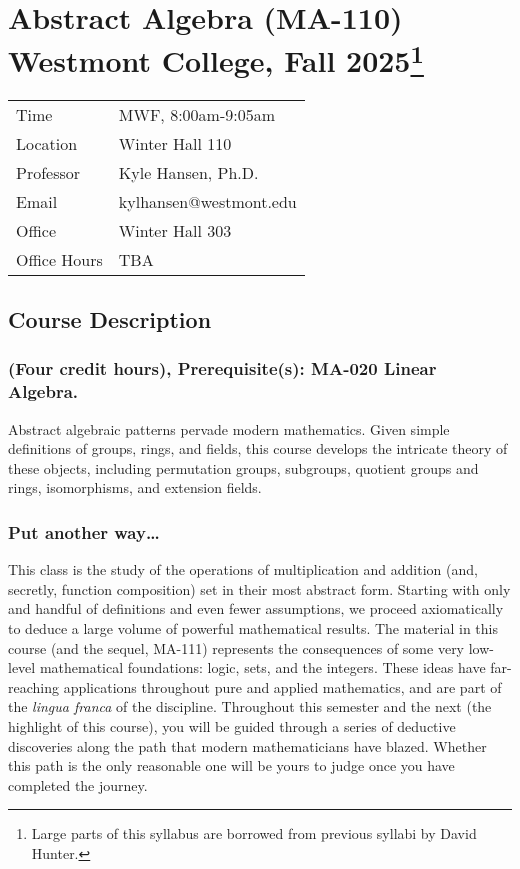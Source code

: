 \documentclass[
  twoside]{article}
\author{}
\date{\vspace{-2.5em}}
\begin{document}
\section[Abstract Algebra (MA-110) Westmont College, Fall
2025]{\texorpdfstring{Abstract Algebra (MA-110) Westmont College, Fall
2025\footnote{Large parts of this syllabus are borrowed from previous
  syllabi by David Hunter.}}{Abstract Algebra (MA-110) Westmont College, Fall 2025}}\label{abstract-algebra-ma-110-westmont-college-fall-20252}

\begin{tabular}[t]{ll}
\toprule
Time & MWF, 8:00am-9:05am\\
Location & Winter Hall 110\\
Professor & Kyle Hansen, Ph.D.\\
Email & kylhansen@westmont.edu\\
Office & Winter Hall 303\\
\addlinespace
Office Hours & TBA\\
\bottomrule
\end{tabular}

\subsection{Course Description}\label{course-description}

\subsubsection{(Four credit hours), Prerequisite(s): MA-020 Linear
Algebra.}\label{four-credit-hours-prerequisites-ma-020-linear-algebra.}

Abstract algebraic patterns pervade modern mathematics. Given simple
definitions of groups, rings, and fields, this course develops the
intricate theory of these objects, including permutation groups,
subgroups, quotient groups and rings, isomorphisms, and extension
fields.

\subsubsection{Put another way\ldots{}}\label{put-another-way}

This class is the study of the operations of multiplication and addition
(and, secretly, function composition) set in their most abstract form.
Starting with only and handful of definitions and even fewer
assumptions, we proceed axiomatically to deduce a large volume of
powerful mathematical results. The material in this course (and the
sequel, MA-111) represents the consequences of some very low-level
mathematical foundations: logic, sets, and the integers. These ideas
have far-reaching applications throughout pure and applied mathematics,
and are part of the \emph{lingua franca} of the discipline. Throughout
this semester and the next (the highlight of this course), you will be
guided through a series of deductive discoveries along the path that
modern mathematicians have blazed. Whether this path is the only
reasonable one will be yours to judge once you have completed the
journey.
\end{document}
